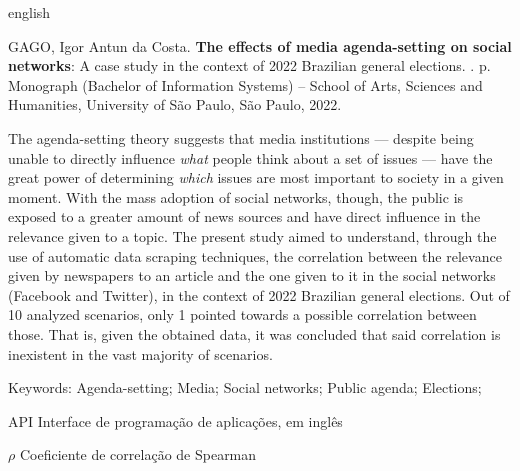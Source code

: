\documentclass[
	12pt,
	oneside,
	a4paper,
	english,
	brazil
]{abntex2ppgsi}
\begin{document}
\begin{resumo}[Abstract]
\begin{otherlanguage*}{english}

\begin{flushleft}
GAGO, Igor Antun da Costa. \textbf{The effects of media agenda-setting on social networks}: A case study in the context of 2022 Brazilian general elections. \imprimirdata. \pageref{LastPage} p. Monograph (Bachelor of Information Systems) – School of Arts, Sciences and Humanities, University of São Paulo, São Paulo, 2022. 
\end{flushleft}

The agenda-setting theory suggests that media institutions — despite being unable to directly influence \textit{what} people think about a set of issues — have the great power of determining \textit{which} issues are most important to society in a given moment. With the mass adoption of social networks, though, the public is exposed to a greater amount of news sources and have direct influence in the relevance given to a topic. The present study aimed to understand, through the use of automatic data scraping techniques, the correlation between the relevance given by newspapers to an article and the one given to it in the social networks (Facebook and Twitter), in the context of 2022 Brazilian general elections. Out of 10 analyzed scenarios, only 1 pointed towards a possible correlation between those. That is, given the obtained data, it was concluded that said correlation is inexistent in the vast majority of scenarios.

Keywords: Agenda-setting; Media; Social networks; Public agenda; Elections;
\end{otherlanguage*}
\end{resumo}

\listoffigures*
\cleardoublepage

\listoftables*
\cleardoublepage

\begin{siglas}
  \item[API] Interface de programação de aplicações, em inglês
\end{siglas}

\begin{simbolos}
  \item[$ \rho $] Coeficiente de correlação de Spearman
\end{simbolos}

\tableofcontents*
\cleardoublepage
\end{document}
